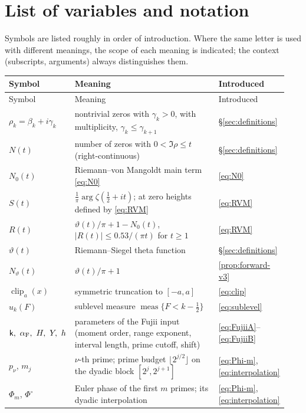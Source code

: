\documentclass[11pt,a4paper]{article}
\numberwithin{equation}{section}
\theoremstyle{definition}
\theoremstyle{remark}
\newcommand{\meas}{\operatorname{meas}}
\newcommand{\clip}{\operatorname{clip}}
\begin{document}
\section*{List of variables and notation}
Symbols are listed roughly in order of introduction. Where the same letter is used with different meanings, the scope of each meaning is indicated; the context (subscripts, arguments) always distinguishes them.
\begingroup\footnotesize
\setlength{\LTpre}{4pt}\setlength{\LTpost}{6pt}
\begin{longtable}{@{}p{0.22\linewidth}p{0.56\linewidth}p{0.16\linewidth}@{}}
\toprule
Symbol & Meaning & Introduced\\
\midrule
\endfirsthead
\toprule
Symbol & Meaning & Introduced\\
\midrule
\endhead
$\rho_k=\beta_k+i\gamma_k$ & nontrivial zeros with $\gamma_k>0$, with multiplicity, $\gamma_k\le\gamma_{k+1}$ & \S\ref{sec:definitions}\\
$N(t)$ & number of zeros with $0<\Im\rho\le t$ (right-continuous) & \S\ref{sec:definitions}\\
$N_0(t)$ & Riemann--von Mangoldt main term \eqref{eq:N0} & \eqref{eq:N0}\\
$S(t)$ & $\frac1\pi\arg\zeta(\frac12+it)$; at zero heights defined by \eqref{eq:RVM} & \eqref{eq:RVM}\\
$R(t)$ & $\vartheta(t)/\pi+1-N_0(t)$, $|R(t)|\le0.53/(\pi t)$ for $t\ge1$ & \eqref{eq:RVM}\\
$\vartheta(t)$ & Riemann--Siegel theta function & \S\ref{sec:definitions}\\
$N_\vartheta(t)$ & $\vartheta(t)/\pi+1$ & \cref{prop:forward-v3}\\
$\clip_a(x)$ & symmetric truncation to $[-a,a]$ & \eqref{eq:clip}\\
$u_k(F)$ & sublevel measure $\meas\{F<k-\frac12\}$ & \eqref{eq:sublevel}\\
$\mathsf k,\ \alpha_{\rm F},\ H,\ Y,\ h$ & parameters of the Fujii input (moment order, range exponent, interval length, prime cutoff, shift) & \eqref{eq:FujiiA}--\eqref{eq:FujiiB}\\
$p_\nu$, $m_j$ & $\nu$-th prime; prime budget $\lfloor2^{j/2}\rfloor$ on the dyadic block $[2^j,2^{j+1}]$ & \eqref{eq:Phi-m}, \eqref{eq:interpolation}\\
$\Phi_m$, $\Phi^\circ$ & Euler phase of the first $m$ primes; its dyadic interpolation & \eqref{eq:Phi-m}, \eqref{eq:interpolation}\\

\end{longtable}
\end{document}
